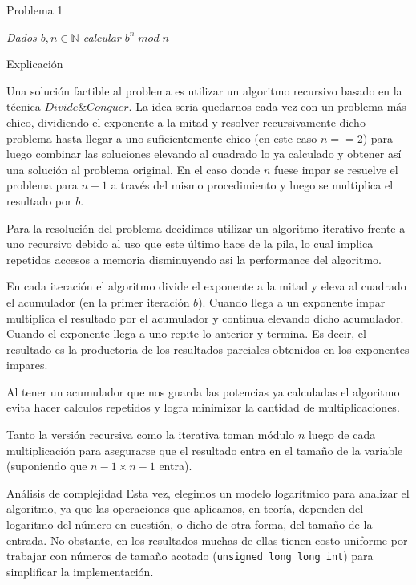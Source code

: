 \begin{section}{Problema 1}

	\textit{Dados $b,n \in \mathbb{N} $ calcular $b^n\; mod\; n$}

	\begin{subsection}{Explicación}

		Una solución factible al problema es utilizar un algoritmo recursivo basado en la técnica $Divide \& Conquer$.
		La idea seria quedarnos cada vez con un problema más chico, dividiendo el exponente a la mitad y resolver recursivamente dicho problema hasta llegar a uno suficientemente chico (en este caso $n==2$) para luego combinar las soluciones elevando al cuadrado lo ya calculado y obtener así una solución al problema original. En el caso donde $n$ fuese impar se resuelve el problema para $n-1$ a través del mismo procedimiento y luego se multiplica el resultado por $b$.

		Para la resolución del problema decidimos utilizar un algoritmo iterativo frente a uno recursivo debido al uso que este último hace de la pila, lo cual implica repetidos accesos a memoria disminuyendo asi la performance del algoritmo.

		En cada iteración el algoritmo divide el exponente a la mitad y eleva al cuadrado el acumulador (en la primer iteración $b$). Cuando llega a un exponente impar multiplica el resultado por el acumulador y continua elevando dicho acumulador. Cuando el exponente llega a uno repite lo anterior y termina. Es decir, el resultado es la productoria de los resultados parciales obtenidos en los exponentes impares.

		Al tener un acumulador que nos guarda las potencias ya calculadas el algoritmo evita hacer calculos repetidos y logra minimizar la cantidad de multiplicaciones.

		Tanto la versión recursiva como la iterativa toman módulo $n$ luego de cada multiplicación para asegurarse que el resultado entra en el tamaño de la variable (suponiendo que $n-1\times n-1$ entra).


		\begin{subsubsection}{Análisis de complejidad}
		Esta vez, elegimos un modelo logarítmico para analizar el algoritmo, ya que las operaciones que aplicamos, en teoría, dependen del logaritmo del número en cuestión, o dicho de otra forma, del tamaño de la entrada. No obstante, en los resultados muchas de ellas tienen costo uniforme por trabajar con números de tamaño acotado (\texttt{unsigned long long int}) para simplificar la implementación.\Pa


\end{subsubsection}
\end{subsection}
\end{section}
